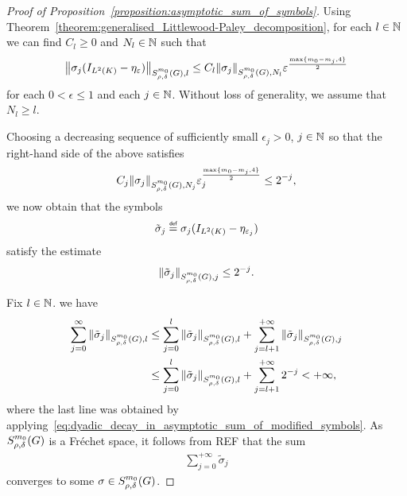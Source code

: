 \begin{proof}[Proof of Proposition~\ref{proposition:asymptotic_sum_of_symbols}]
    Using Theorem~\ref{theorem:generalised_Littlewood-Paley_decomposition},
    for each $l \in \N$ we can find $C_l \geq 0$ and $N_l \in \N$ such that
    \begin{align*}
        \SymbolSemiNorm {m_0} {\rho, \delta} l {\sigma_j (\Id {\Lebesgue 2 \CompactGroup} - \eta_\epsilon)}
        \leq C_l \SymbolSemiNorm {m_0} {\rho, \delta} {N_l} {\sigma_j}
        \epsilon^{\frac {\max\{m_0 - m_j, 4\}} 2}
    \end{align*}
    for each $0 < \epsilon \leq 1$ and each $j \in \N$.
    Without loss of generality,
    we assume that $N_l \geq l$.

    Choosing a decreasing sequence of sufficiently small $\epsilon_j > 0$, $j \in \N$
    so that the right-hand side of the above satisfies
    \begin{align*}
        C_j \SymbolSemiNorm {m_0} {\rho, \delta} {N_j} {\sigma_j} \epsilon_j^{\frac {\max \{m_0 - m_j, 4\}} 2}
        \leq 2^{-j},
    \end{align*}
    we now obtain that the symbols
    \begin{align*}
        \tilde \sigma_j \defeq \sigma_j (\Id {\Lebesgue 2 \CompactGroup} - \eta_{\epsilon_j})
    \end{align*}
    satisfy the estimate
    \begin{align}
        \SymbolSemiNorm {m_0} {\rho, \delta} j {\tilde \sigma_j}
        \leq 2^{-j}.
        \label{eq:dyadic_decay_in_asymptotic_sum_of_modified_symbols}
    \end{align}

    Fix $l \in \N$.
    we have
    \begin{align}
        \sum_{j = 0}^\infty \SymbolSemiNorm {m_0} {\rho, \delta} l {\tilde \sigma_j}
        &\leq \sum_{j = 0}^l \SymbolSemiNorm {m_0} {\rho, \delta} l {\tilde \sigma_j}
        + \sum_{j = l + 1}^{+\infty} \SymbolSemiNorm {m_0} {\rho, \delta} {j} {\tilde \sigma_j} \notag\\
        &\leq \sum_{j = 0}^l \SymbolSemiNorm {m_0} {\rho, \delta} l {\tilde \sigma_j}
        + \sum_{j = l + 1}^{+\infty} 2^{-j} < + \infty,
        \label{eq:convergence_of_asymptotic_sum_of_modified_symbols}
    \end{align}
    where the last line was obtained by applying~\eqref{eq:dyadic_decay_in_asymptotic_sum_of_modified_symbols}.
    As $\SymbolClass {m_0} {\rho, \delta}$ is a Fr\'echet space,
    it follows from REF that the sum
    \begin{align*}
        \sum_{j = 0}^{+\infty} \tilde \sigma_j
    \end{align*}
    converges to some $\sigma \in \SymbolClass {m_0} {\rho, \delta}$.


\end{proof}
